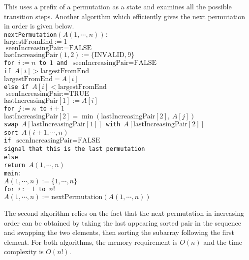 \documentclass[a4paper,11pt]{article}
\begin{document}
\noindent
This uses a prefix of a permutation as a state and examines all the possible transition steps. Another algorithm which efficiently gives the next permutation in order is given below. \\
\texttt{nextPermutation$(A(1, \cdots, n))$: \\
\indent $\text{largestFromEnd} := 1$ \\
\indent $\text{seenIncreasingPair} := \text{FALSE}$ \\
\indent $\text{lastIncreasingPair}(1, 2) := \{ \text{INVALID}, 9 \}$ \\
\indent for $i := n$ to $1$ and $\text{seenIncreasingPair} = \text{FALSE}$ \\
\indent \indent if $A[i] > \text{largestFromEnd}$ \\
\indent \indent \indent $\text{largestFromEnd} = A[i]$ \\
\indent \indent else if $A[i] < \text{largestFromEnd}$ \\
\indent \indent \indent $\text{seenIncreasingPair} := \text{TRUE}$ \\
\indent \indent \indent $\text{lastIncreasingPair}[1] := A[i]$ \\
\indent \indent \indent for $j := n$ to $i + 1$ \\
\indent \indent \indent \indent $\text{lastIncreasingPair}[2] = \min(\text{lastIncreasingPair}[2],\ A[j])$ \\
\indent \indent \indent swap $A[\text{lastIncreasingPair}[1]]$ with $A[\text{lastIncreasingPair}[2]]$ \\
\indent \indent \indent sort $A(i + 1, \cdots, n)$ \\
\indent if $\text{seenIncreasingPair} = \text{FALSE}$ \\
\indent \indent signal that this is the last permutation \\
\indent else \\
\indent \indent return $A(1, \cdots, n)$
} \\
\noindent
\texttt{main: \\
\indent $A(1, \cdots, n) := \{ 1, \cdots, n \}$ \\
\indent for $i := 1$ to $n!$ \\
\indent \indent $A(1, \cdots, n) := \text{nextPermutation}(A(1, \cdots, n))$
} \\\par
The second algorithm relies on the fact that the next permutation in increasing order can be obtained by taking the last appearing sorted pair in the sequence and swapping the two elements, then sorting the subarray following the first element. For both algorithms, the memory requirement is $O(n)$ and the time complexity is $O(n!)$.
\end{document}
